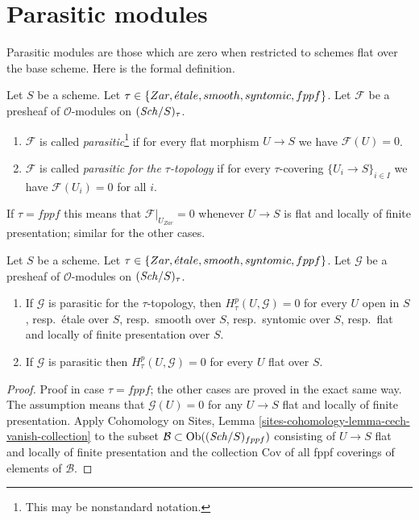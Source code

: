 \section{Parasitic modules}
\label{section-parasitic}

\noindent
Parasitic modules are those which are zero when restricted
to schemes flat over the base scheme. Here is the formal definition.

\begin{definition}
\label{definition-parasitic}
Let $S$ be a scheme. Let $\tau \in \{Zar, {\acute{e}tale},
smooth, syntomic, fppf\}$. Let $\mathcal{F}$ be a presheaf
of $\mathcal{O}$-modules on $(\mathit{Sch}/S)_\tau$.
\begin{enumerate}
\item $\mathcal{F}$ is called
{\it parasitic}\footnote{This may be nonstandard notation.}
if for every flat morphism $U \to S$ we have $\mathcal{F}(U) = 0$.
\item $\mathcal{F}$ is called {\it parasitic for the $\tau$-topology}
if for every $\tau$-covering $\{U_i \to S\}_{i \in I}$ we have
$\mathcal{F}(U_i) = 0$ for all $i$.
\end{enumerate}
\end{definition}

\noindent
If $\tau = fppf$ this means that $\mathcal{F}|_{U_{Zar}} = 0$ whenever
$U \to S$ is flat and locally of finite presentation; similar for
the other cases.

\begin{lemma}
\label{lemma-cohomology-parasitic}
Let $S$ be a scheme. Let $\tau \in \{Zar, {\acute{e}tale}, smooth,
syntomic, fppf\}$. Let $\mathcal{G}$ be a presheaf of
$\mathcal{O}$-modules on $(\mathit{Sch}/S)_\tau$.
\begin{enumerate}
\item If $\mathcal{G}$ is parasitic for the $\tau$-topology, then
$H^p_\tau(U, \mathcal{G}) = 0$ for every $U$ open in $S$,
resp.\ \'etale over $S$,
resp.\ smooth over $S$,
resp.\ syntomic over $S$,
resp.\ flat and locally of finite presentation over $S$.
\item If $\mathcal{G}$ is parasitic then $H^p_\tau(U, \mathcal{G}) = 0$
for every $U$ flat over $S$.
\end{enumerate}
\end{lemma}

\begin{proof}
Proof in case $\tau = fppf$; the other cases are proved in the
exact same way. The assumption means that $\mathcal{G}(U) = 0$ for any
$U \to S$ flat and locally of finite presentation. Apply
Cohomology on Sites, Lemma \ref{sites-cohomology-lemma-cech-vanish-collection}
to the subset $\mathcal{B} \subset \mathop{\mathrm{Ob}}\nolimits((\mathit{Sch}/S)_{fppf})$ consisting
of $U \to S$ flat and locally of finite presentation and the collection
$\text{Cov}$ of all fppf coverings of elements of $\mathcal{B}$.
\end{proof}

